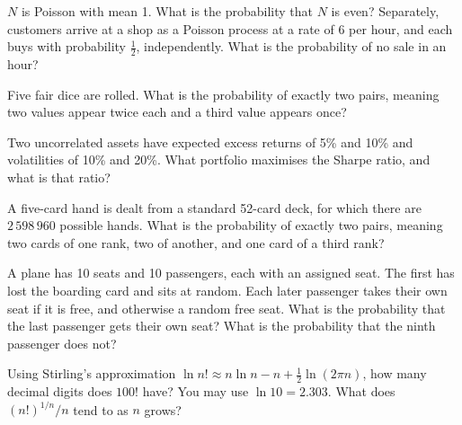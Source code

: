 \begin{question}\label{iq:iv1:timed-test-9:7}
$N$ is Poisson with mean 1. What is the probability that $N$ is even? Separately, customers arrive at a shop as a Poisson process at a rate of 6 per hour, and each buys with probability $\frac12$, independently. What is the probability of no sale in an hour?
\end{question}

\begin{question}\label{iq:iv1:timed-test-9:8}
Five fair dice are rolled. What is the probability of exactly two pairs, meaning two values appear twice each and a third value appears once?
\end{question}

\begin{question}\label{iq:iv1:timed-test-9:9}
Two uncorrelated assets have expected excess returns of 5\% and 10\% and volatilities of 10\% and 20\%. What portfolio maximises the Sharpe ratio, and what is that ratio?
\end{question}

\begin{question}\label{iq:iv1:timed-test-9:10}
A five-card hand is dealt from a standard 52-card deck, for which there are $2\,598\,960$ possible hands. What is the probability of exactly two pairs, meaning two cards of one rank, two of another, and one card of a third rank?
\end{question}

\begin{question}\label{iq:iv1:timed-test-9:11}
A plane has 10 seats and 10 passengers, each with an assigned seat. The first has lost the boarding card and sits at random. Each later passenger takes their own seat if it is free, and otherwise a random free seat. What is the probability that the last passenger gets their own seat? What is the probability that the ninth passenger does not?
\end{question}

\begin{question}\label{iq:iv1:timed-test-9:12}
Using Stirling's approximation $\ln n! \approx n\ln n - n + \frac12\ln(2\pi n)$, how many decimal digits does $100!$ have? You may use $\ln 10 = 2.303$. What does $(n!)^{1/n}/n$ tend to as $n$ grows?
\end{question}
